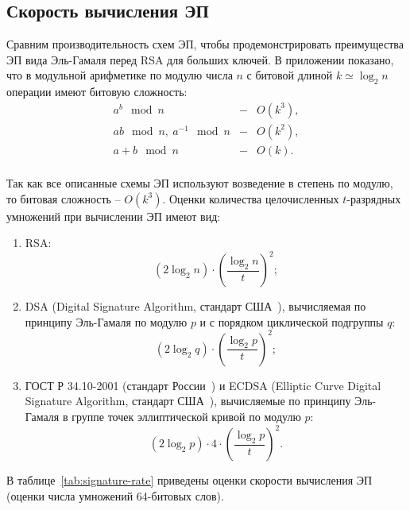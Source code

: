 \subsection*{Скорость вычисления ЭП}

Сравним производительность схем ЭП, чтобы продемонстрировать преимущества ЭП вида Эль-Гамаля перед RSA для больших ключей. В приложении показано, что в модульной арифметике по модулю числа $n$ с битовой длиной $k \simeq \log_2 n$ операции имеют битовую сложность:
\[ \begin{array}{lcl}
    a^b \mod n & - & O(k^3), \\
    ab \mod n, ~ a^{-1} \mod n & - & O(k^2), \\
    a+b \mod n & - & O(k). \\
\end{array} \]

Так как все описанные схемы ЭП используют возведение в степень по модулю, то битовая сложность -- $O(k^3)$. Оценки количества целочисленных $t$-разрядных умножений при вычислении ЭП имеют вид:
\begin{enumerate}
    \item RSA:
        \[ (2 \log_2 n) \cdot \left( \frac{\log_2 n}{t} \right)^2; \]
    \item DSA (Digital Signature Algorithm, стандарт США~\cite{FIPS-PUB-186-4}), вычисляемая по принципу Эль-Гамаля по модулю $p$ и с порядком циклической подгруппы $q$:
        \[ (2 \log_2 q) \cdot \left( \frac{\log_2 p}{t} \right)^2; \]
    \item ГОСТ Р 34.10-2001 (стандарт России~\cite{GOST-2001}) и ECDSA (Elliptic Curve Digital Signature Algorithm, стандарт США~\cite{FIPS-PUB-186-4}), вычисляемые по принципу Эль-Гамаля в группе точек эллиптической кривой по модулю $p$:
        \[ (2 \log_2 p) \cdot 4 \cdot \left( \frac{\log_2 p}{t} \right)^2. \]
\end{enumerate}

В таблице~\ref{tab:signature-rate} приведены оценки скорости вычисления ЭП (оценки числа умножений 64-битовых слов).

